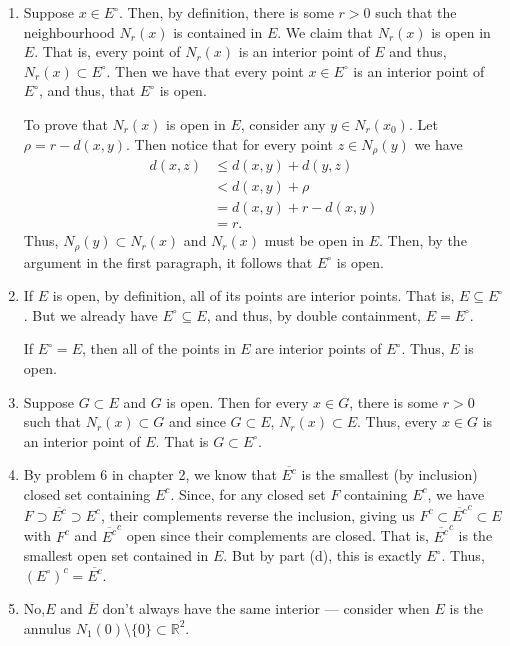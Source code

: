 \documentclass[12 pt, letterpaper]{hmcpset}
\begin{document}
\begin{solution}
	\begin{enumerate}
		\item Suppose $x \in E^{\circ}$. Then, by definition, there is some $r > 0$ such that the neighbourhood $N_{r}(x)$ is contained in $E$. We claim that $N_{r}(x)$ is open in $E$. That is, every point of $N_{r}(x)$ is an interior point of $E$ and thus, $N_{r}(x) \subset E^{\circ}$. Then we have that every point $x \in E^{\circ}$ is an interior point of $E^{\circ}$, and thus, that $E^{\circ}$ is open.

			To prove that $N_{r}(x)$ is open in $E$, consider any $y \in N_{r}(x_{0})$. Let $\rho = r - d(x, y)$. Then notice that for every point $z \in N_{\rho}(y)$ we have
			\[
				\begin{split}
					d(x, z) & \le d(x, y) + d(y, z) \\
						& < d(x, y) + \rho \\
						& = d(x, y) + r - d(x, y) \\
						& = r.
				\end{split}
			\]
			Thus, $N_{\rho}(y) \subset N_{r}(x)$ and $N_{r}(x)$ must be open in $E$. Then, by the argument in the first paragraph, it follows that $E^{\circ}$ is open.
		\item If $E$ is open, by definition, all of its points are interior points. That is, $E \subseteq E^{\circ}$. But we already have $E^{\circ} \subseteq E$, and thus, by double containment, $E = E^{\circ}$.

			If $E^{\circ} = E$, then all of the points in $E$ are interior points of $E^{\circ}$. Thus, $E$ is open.
		\item Suppose $G \subset E$ and $G$ is open. Then for every $x \in G$, there is some $r  > 0$ such that $N_{r}(x) \subset G$ and since $G \subset E$, $N_{r}(x) \subset E$. Thus, every $x \in G$ is an interior point of $E$. That is $G \subset E^{\circ}$.
		\item By problem 6 in chapter 2, we know that $\overline{E^{c}}$ is the smallest (by inclusion) closed set containing $E^{c}$. Since, for any closed set $F$ containing $E^{c}$, we have $F \supset \overline{E^{c}} \supset E^{c}$, their complements reverse the inclusion, giving us $F^{c} \subset \overline{E^{c}}^{c} \subset E$ with $F^{c}$ and $\overline{E^{c}}^{c}$ open since their complements are closed. That is, $\overline{E^{c}}^{c}$ is the smallest open set contained in  $E$. But by part (d), this is exactly  $E^{\circ}$. Thus, $(E^{\circ})^{c} = \overline{E^{c}}$.
		\item No,$E$ and $\overline{E}$ don't always have the same interior --- consider when $E$ is the annulus $N_{1}(0) \setminus \{ 0 \} \subset \mathbb{R}^{2}$. 


\end{enumerate}
\end{solution}
\end{document}
